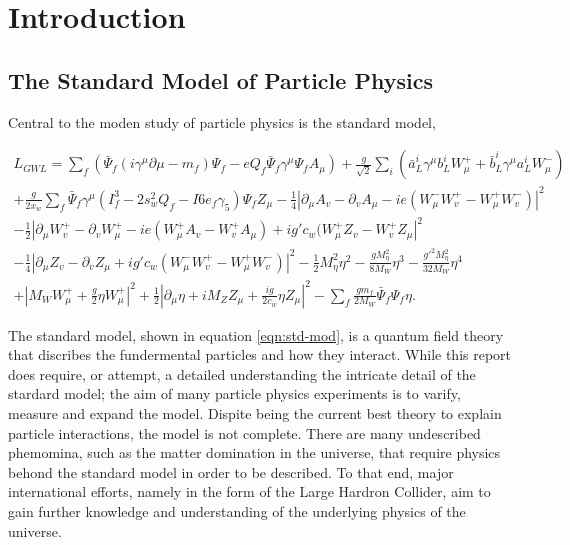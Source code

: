 \section{Introduction}

	\subsection{The Standard Model of Particle Physics}

    Central to the moden study of particle physics is the standard model,

    \begin{multline} \label{eqn:std-mod}
      L_{GWL} = \sum_{f} ( \bar{\Psi}_{f} ( i \gamma^\mu \partial \mu - m_{f} ) \Psi_{f} - eQ_{f} \bar{\Psi}_{f} \gamma^\mu \Psi_{f} A_{\mu} ) + \frac{g}{\sqrt{2}} \sum_{i} ( \bar{a}^i_L \gamma^\mu b^i_L W^+_\mu + \bar{b}^i_L \gamma^\mu a^i_L W^-_\mu )                        \\                           
              + \frac{g}{2x_w} \sum_f \bar{\Psi}_f \gamma^\mu ( I^3_f - 2s^2_w Q_f - I6e_f \gamma_5 ) \Psi_f Z_\mu - \frac{1}{4} | \partial_\mu A_v - \partial_v A_\mu - ie(W^-_\mu W^+_v - W^+_\mu W^-_v ) |^2                                         \\                                     
              - \frac{1}{2} | \partial_\mu W^+_v - \partial_v W^+_\mu - ie ( W^+_\mu A_v - W^+_v A_\mu ) + ig' c_w (W^+_\mu Z_v - W^+_v Z_\mu |^2 \\
              - \frac{1}{4} | \partial_\mu Z_v - \partial_v Z_\mu + ig' c_w (W^-_\mu W^+_v - W^+_\mu W^-_v ) |^2 - \frac{1}{2} M^2_\eta \eta^2  - \frac{gM^2_\eta}{8M_W} \eta^3  - \frac{g'^2 M^2_\eta}{32M_W}\eta^4    \\     
              + | M_W W^+_\mu + \frac{g}{2} \eta W^+_\mu |^2 + \frac{1}{2} | \partial_\mu \eta + i M_Z Z_\mu + \frac{ig}{2c_w} \eta Z_\mu |^2 - \sum_f \frac{g m_f}{2 M_W} \bar{\Psi}_f \Psi_f \eta.                                                                                
    \end{multline}

    The standard model, shown in equation \ref{eqn:std-mod}, is a quantum field theory that discribes the fundermental particles and how they interact.
    While this report does require, or attempt, a detailed understanding the intricate detail of the stardard model;
    the aim of many particle physics experiments is to varify, measure and expand the model.
    Dispite being the current best theory to explain particle interactions, the model is not complete.
    There are many undescribed phemomina, such as the matter domination in the universe, that require physics behond the standard model in order to be described.
    To that end, major international efforts, namely in the form of the Large Hardron Collider, aim to gain further knowledge and understanding of the underlying physics of the universe. \cite{ref:std}

